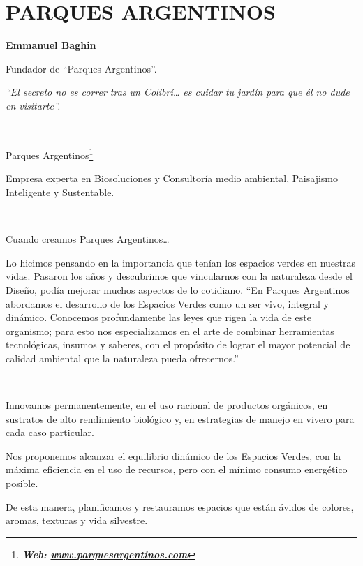 \chapter{PARQUES ARGENTINOS}\label{parques-argentinos}


\textbf{Emmanuel Baghin}

Fundador de ``Parques Argentinos''.

\emph{``El secreto no es correr tras un Colibrí\ldots{} es cuidar tu
jardín para que él no dude en visitarte''.}

\textbf{\\
}

Parques Argentinos\footnote{\textbf{\emph{Web:
  \href{http://www.parquesargentinos.com}{\emph{www.parquesargentinos.com}}}}}

Empresa experta en Biosoluciones y Consultoría medio ambiental,
Paisajismo Inteligente y Sustentable.

~

Cuando creamos Parques Argentinos\ldots{}

Lo hicimos pensando en la importancia que tenían los espacios verdes en
nuestras vidas. Pasaron los años y descubrimos que vincularnos con la
naturaleza desde el Diseño, podía mejorar muchos aspectos de lo
cotidiano. ``En Parques Argentinos abordamos el desarrollo de los
Espacios Verdes como un ser vivo, integral y dinámico. Conocemos
profundamente las leyes que rigen la vida de este organismo; para esto
nos especializamos en el arte de combinar herramientas tecnológicas,
insumos y saberes, con el propósito de lograr el mayor potencial de
calidad ambiental que la naturaleza pueda ofrecernos.''

~

Innovamos permanentemente, en el uso racional de productos orgánicos, en
sustratos de alto rendimiento biológico y, en estrategias de manejo en
vivero para cada caso particular.

Nos proponemos alcanzar el equilibrio dinámico de los Espacios Verdes,
con la máxima eficiencia en el uso de recursos, pero con el mínimo
consumo energético posible.

De esta manera, planificamos y restauramos espacios que están ávidos de
colores, aromas, texturas y vida silvestre.


